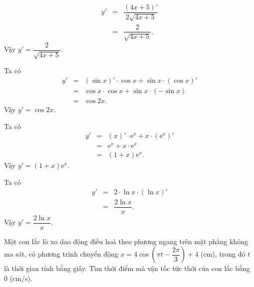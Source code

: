 \begin{bt}
{\begin{listEX}
			\begin{eqnarray*}
				y'&=&\dfrac{(4x+5)'}{2\sqrt{4x+5}}\\
				&=&\dfrac{2}{\sqrt{4x+5}}.
			\end{eqnarray*}
			Vậy $y'=\dfrac{2}{\sqrt{4x+5}}$.
			\item[d)] Ta có 
			\allowdisplaybreaks
			\begin{eqnarray*}
				y'&=&\left( \sin x\right)'  \cdot \cos x + \sin x \cdot \left( \cos x\right) '\\
				&=& \cos x \cdot \cos x + \sin x \cdot \left( -\sin x \right) \\
				&=&\cos2x.
			\end{eqnarray*}
			Vậy $y'=\cos2x$.
			\item[e)] Ta có 
			\allowdisplaybreaks
			\begin{eqnarray*}
				y'&=&\left( x\right)' \cdot \mathrm{e}^x + x \cdot \left( \mathrm{e}^x\right) '\\
				&=& \mathrm{e}^x + x \cdot \mathrm{e}^x \\
				&=&\left( 1+x\right) \mathrm{e}^x.
			\end{eqnarray*}
			Vậy $y'=\left( 1+x\right) \mathrm{e}^x.$
			\item[f)] Ta có 
			\allowdisplaybreaks
			\begin{eqnarray*}
				y'&=&2\cdot \ln x \cdot \left(\ln x \right)' \\
				&=& \dfrac{2 \ln x}{x}.
			\end{eqnarray*}
			Vậy $y'=\dfrac{2 \ln x}{x}.$
	\end{listEX}}
\end{bt}

\begin{bt}%
	Một con lắc lò xo dao động điều hoà theo phương ngang trên mặt phẳng không ma sát, có phương trình chuyển động $x=4\cos \left(\pi t-\dfrac{2\pi}{3}\right)+4$ (cm), trong đó $t$ là thời gian tính bằng giây. Tìm thời điểm mà vận tốc tức thời của con lắc bằng $0$  (cm/s).
\end{bt}

